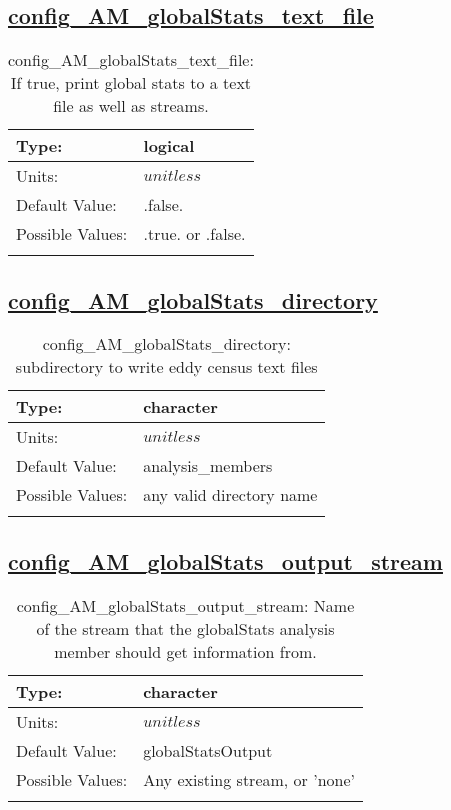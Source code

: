 \subsection[config\_AM\_globalStats\_text\_file]{\hyperref[sec:nm_tab_AM_globalStats]{config\_AM\_globalStats\_text\_file}}
\label{subsec:nm_sec_config_AM_globalStats_text_file}
\begin{center}
\begin{longtable}{| p{2.0in} || p{4.0in} |}
    \hline
    Type: & logical \\
    \hline
    Units: & $unitless$ \\
    \hline
    Default Value: & .false. \\
    \hline
    Possible Values: & .true. or .false. \\
    \hline
    \caption{config\_AM\_globalStats\_text\_file: If true, print global stats to a text file as well as streams.}
\end{longtable}
\end{center}
\subsection[config\_AM\_globalStats\_directory]{\hyperref[sec:nm_tab_AM_globalStats]{config\_AM\_globalStats\_directory}}
\label{subsec:nm_sec_config_AM_globalStats_directory}
\begin{center}
\begin{longtable}{| p{2.0in} || p{4.0in} |}
    \hline
    Type: & character \\
    \hline
    Units: & $unitless$ \\
    \hline
    Default Value: & analysis\_members \\
    \hline
    Possible Values: & any valid directory name \\
    \hline
    \caption{config\_AM\_globalStats\_directory: subdirectory to write eddy census text files}
\end{longtable}
\end{center}
\subsection[config\_AM\_globalStats\_output\_stream]{\hyperref[sec:nm_tab_AM_globalStats]{config\_AM\_globalStats\_output\_stream}}
\label{subsec:nm_sec_config_AM_globalStats_output_stream}
\begin{center}
\begin{longtable}{| p{2.0in} || p{4.0in} |}
    \hline
    Type: & character \\
    \hline
    Units: & $unitless$ \\
    \hline
    Default Value: & globalStatsOutput \\
    \hline
    Possible Values: & Any existing stream, or 'none' \\
    \hline
    \caption{config\_AM\_globalStats\_output\_stream: Name of the stream that the globalStats analysis member should get information from.}
\end{longtable}
\end{center}
